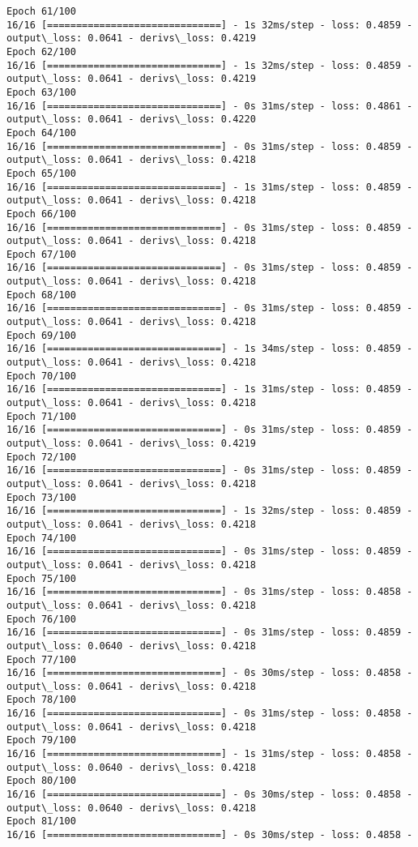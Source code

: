 \documentclass[11pt]{article}
\begin{document}
\begin{Verbatim}[commandchars=\\\{\}]
Epoch 61/100
16/16 [==============================] - 1s 32ms/step - loss: 0.4859 -
output\_loss: 0.0641 - derivs\_loss: 0.4219
Epoch 62/100
16/16 [==============================] - 1s 32ms/step - loss: 0.4859 -
output\_loss: 0.0641 - derivs\_loss: 0.4219
Epoch 63/100
16/16 [==============================] - 0s 31ms/step - loss: 0.4861 -
output\_loss: 0.0641 - derivs\_loss: 0.4220
Epoch 64/100
16/16 [==============================] - 0s 31ms/step - loss: 0.4859 -
output\_loss: 0.0641 - derivs\_loss: 0.4218
Epoch 65/100
16/16 [==============================] - 1s 31ms/step - loss: 0.4859 -
output\_loss: 0.0641 - derivs\_loss: 0.4218
Epoch 66/100
16/16 [==============================] - 0s 31ms/step - loss: 0.4859 -
output\_loss: 0.0641 - derivs\_loss: 0.4218
Epoch 67/100
16/16 [==============================] - 0s 31ms/step - loss: 0.4859 -
output\_loss: 0.0641 - derivs\_loss: 0.4218
Epoch 68/100
16/16 [==============================] - 0s 31ms/step - loss: 0.4859 -
output\_loss: 0.0641 - derivs\_loss: 0.4218
Epoch 69/100
16/16 [==============================] - 1s 34ms/step - loss: 0.4859 -
output\_loss: 0.0641 - derivs\_loss: 0.4218
Epoch 70/100
16/16 [==============================] - 1s 31ms/step - loss: 0.4859 -
output\_loss: 0.0641 - derivs\_loss: 0.4218
Epoch 71/100
16/16 [==============================] - 0s 31ms/step - loss: 0.4859 -
output\_loss: 0.0641 - derivs\_loss: 0.4219
Epoch 72/100
16/16 [==============================] - 0s 31ms/step - loss: 0.4859 -
output\_loss: 0.0641 - derivs\_loss: 0.4218
Epoch 73/100
16/16 [==============================] - 1s 32ms/step - loss: 0.4859 -
output\_loss: 0.0641 - derivs\_loss: 0.4218
Epoch 74/100
16/16 [==============================] - 0s 31ms/step - loss: 0.4859 -
output\_loss: 0.0641 - derivs\_loss: 0.4218
Epoch 75/100
16/16 [==============================] - 0s 31ms/step - loss: 0.4858 -
output\_loss: 0.0641 - derivs\_loss: 0.4218
Epoch 76/100
16/16 [==============================] - 0s 31ms/step - loss: 0.4859 -
output\_loss: 0.0640 - derivs\_loss: 0.4218
Epoch 77/100
16/16 [==============================] - 0s 30ms/step - loss: 0.4858 -
output\_loss: 0.0641 - derivs\_loss: 0.4218
Epoch 78/100
16/16 [==============================] - 0s 31ms/step - loss: 0.4858 -
output\_loss: 0.0641 - derivs\_loss: 0.4218
Epoch 79/100
16/16 [==============================] - 1s 31ms/step - loss: 0.4858 -
output\_loss: 0.0640 - derivs\_loss: 0.4218
Epoch 80/100
16/16 [==============================] - 0s 30ms/step - loss: 0.4858 -
output\_loss: 0.0640 - derivs\_loss: 0.4218
Epoch 81/100
16/16 [==============================] - 0s 30ms/step - loss: 0.4858 -

\end{Verbatim}
\end{document}
